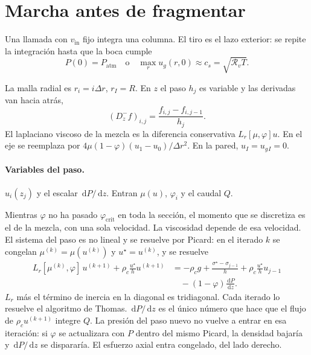 \documentclass[11pt,a4paper]{article}
\newcommand{\dd}{\,\mathrm{d}}
\newcommand{\Rv}{\mathcal{R}_v}
\newcommand{\vin}{v_{\mathrm{in}}}
\begin{document}
\section{Marcha antes de fragmentar}
\label{sec:marcha}

Una llamada con $\vin$ fijo integra una columna. El tiro es el lazo
exterior: se repite la integración hasta que la boca cumple
\begin{equation}
\label{eq:boca}
P(0)=P_{\mathrm{atm}}
\quad\text{o}\quad
\max_r u_g(r,0)\approx c_s=\sqrt{\Rv T}.
\end{equation}

La malla radial es $r_i=i\Delta r$, $r_I=R$. En $z$ el paso $h_j$
es variable y las derivadas van hacia atrás,
\begin{equation}
\label{eq:Dz}
(D_z^- f)_{i,j}=\frac{f_{i,j}-f_{i,j-1}}{h_j}.
\end{equation}
El laplaciano viscoso de la mezcla es la diferencia conservativa
$L_r[\mu,\varphi]u$. En el eje se reemplaza por
$4\mu(1-\varphi)(u_1-u_0)/\Delta r^2$. En la pared,
$u_I=u_g{}_{I}=0$.

\paragraph{Variables del paso.}
$u_{i}(z_j)$ y el escalar $\dd P/\dd z$. Entran $\mu(u)$, $\varphi_i$
y el caudal $Q$.

Mientras $\varphi$ no ha pasado $\varphi_{\mathrm{crit}}$ en toda
la sección, el momento que se discretiza es el de la mezcla, con
una sola velocidad. La viscosidad depende de esa velocidad. El
sistema del paso es no lineal y se resuelve por Picard: en el
iterado $k$ se congelan $\mu^{(k)}=\mu(u^{(k)})$ y
$u^\star=u^{(k)}$, y se resuelve
\begin{equation}
\label{eq:picard}
\begin{aligned}
L_r[\mu^{(k)},\varphi]\,u^{(k+1)}
+\rho_c\frac{u^\star}{h}u^{(k+1)}
&=
-\rho_c g+\frac{\sigma^\star-\sigma_{j-1}}{h}
+\rho_c\frac{u^\star}{h}u_{j-1}
\\
&\quad
-(1-\varphi)\frac{\dd P}{\dd z}.
\end{aligned}
\end{equation}
$L_r$ más el término de inercia en la diagonal es tridiagonal. Cada
iterado lo resuelve el algoritmo de Thomas. $\dd P/\dd z$ es el
único número que hace que el flujo de $\rho_c u^{(k+1)}$ integre
$Q$. La presión del paso nuevo no vuelve a entrar en esa iteración:
si $\varphi$ se actualizara con $P$ dentro del mismo Picard, la
densidad bajaría y $\dd P/\dd z$ se dispararía. El esfuerzo axial
entra congelado, del lado derecho.
\end{document}
